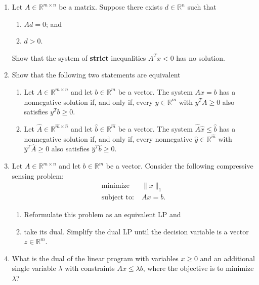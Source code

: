 \documentclass[11pt]{article}
\newcommand{\RR}{\mathbb{R}}
\newcommand{\minimize}{\mathrm{minimize}}
\begin{document}

\begin{enumerate}
\item Let $A \in \mathbb{R}^{m \times n}$ be a matrix. Suppose there exists $d \in \RR^n$ such that 
\begin{enumerate}
\item $Ad = 0$; and 
\item $d > 0$.
\end{enumerate}
Show that the system of \textbf{strict} inequalities $A^T x < 0$ has no solution. 
\item  Show that the following two statements are equivalent
\begin{enumerate}
\item Let $A \in \mathbb{R}^{ m\times n}$ and let $b \in \RR^m$ be a vector. The system $Ax = b$ has a nonnegative solution if, and only if, every $y \in \RR^m$ with $y^TA \geq 0$ also satisfies $y^Tb \geq 0$.
\item Let $\hat{A} \in \mathbb{R}^{ \hat{m}\times \hat{n}}$ and let $\hat{b} \in \RR^{\hat{m}}$ be a vector. The system $\hat{A}\hat{x} \leq \hat{b}$ has a nonnegative solution if, and only if, every nonnegative $\hat{y} \in \RR^{\hat{m}}$ with $\hat{y}^T \hat{A} \geq 0$ also satisfies $\hat{y}^T \hat{b} \geq 0$.
\end{enumerate}
\item Let $A \in \mathbb{R}^{m\times n}$ and let $b \in \RR^m$ be a vector. Consider the following compressive sensing problem:
\begin{align*}
\minimize &\; \|x\|_1 \\
\text{subject to:}& \; A x = b. 
\end{align*}
\begin{enumerate}
\item Reformulate this problem as an equivalent LP and
\item take its dual. Simplify the dual LP until the decision variable is a vector $z \in \RR^m$.
\end{enumerate}

\item What is the dual of the linear program with variables $x \ge 0$ and
an additional single variable $\lambda$ with constraints $Ax \le \lambda b$,
where the objective is to minimize $\lambda$?


\end{enumerate}
\end{document}
